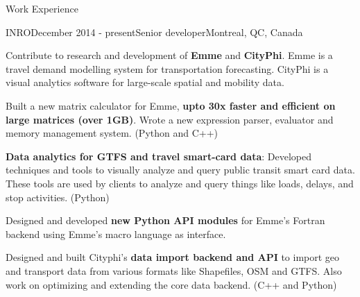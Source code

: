 \documentclass{resume} %
\begin{document}
\begin{rSection}{Work Experience}

\begin{rSubsection}{INRO}{December 2014 - present}{Senior developer}{Montreal,
        QC, Canada}
\item Contribute to research and development of \textbf{Emme} and
        \textbf{CityPhi}. Emme is a travel demand modelling system for
        transportation forecasting. CityPhi is a visual analytics software for
        large-scale spatial and mobility data.
        
\item Built a new matrix calculator for Emme, \textbf{upto 30x faster and
        efficient on large matrices (over 1GB)}. Wrote a new expression parser,
        evaluator and memory management system. (Python and C++)
\item \textbf{Data analytics for GTFS and travel smart-card data}: Developed
        techniques and tools to visually analyze and query public transit smart card
        data. These tools are used by clients to analyze and query things like
        loads, delays, and stop activities. (Python)
\item Designed and developed \textbf{new Python API modules} for Emme's Fortran
        backend using Emme's macro language as interface. 
\item Designed and built Cityphi's \textbf{data import backend and API} to
        import geo and transport data from various formats like Shapefiles, OSM
        and GTFS.  Also work on optimizing and extending the core data backend.
        (C++ and Python)
\end{rSubsection}


\end{rSection}
\end{document}
